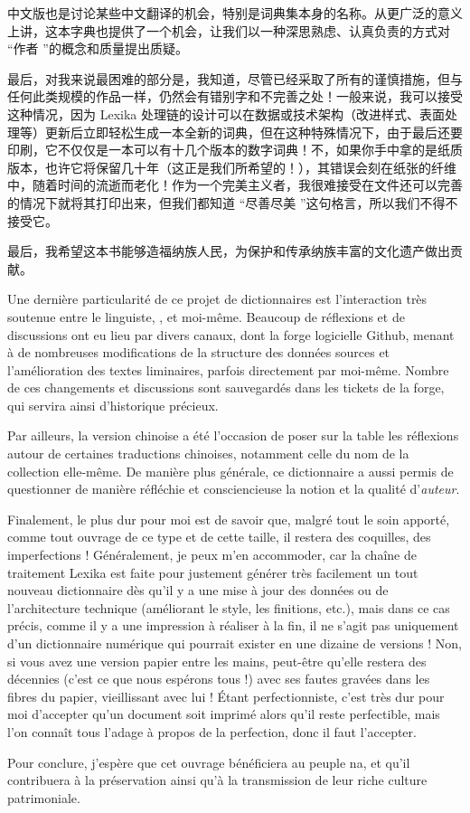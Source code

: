 中文版也是讨论某些中文翻译的机会，特别是词典集本身的名称。从更广泛的意义上讲，这本字典也提供了一个机会，让我们以一种深思熟虑、认真负责的方式对 “作者 ”的概念和质量提出质疑。

最后，对我来说最困难的部分是，我知道，尽管已经采取了所有的谨慎措施，但与任何此类规模的作品一样，仍然会有错别字和不完善之处！一般来说，我可以接受这种情况，因为 Lexika 处理链的设计可以在数据或技术架构（改进样式、表面处理等）更新后立即轻松生成一本全新的词典，但在这种特殊情况下，由于最后还要印刷，它不仅仅是一本可以有十几个版本的数字词典！不，如果你手中拿的是纸质版本，也许它将保留几十年（这正是我们所希望的！），其错误会刻在纸张的纤维中，随着时间的流逝而老化！作为一个完美主义者，我很难接受在文件还可以完善的情况下就将其打印出来，但我们都知道 “尽善尽美 ”这句格言，所以我们不得不接受它。

最后，我希望这本书能够造福纳族人民，为保护和传承纳族丰富的文化遗产做出贡献。



Une dernière particularité de ce projet de dictionnaires est l’interaction très soutenue entre le linguiste, \alexisfra, et moi-même. Beaucoup de réflexions et de discussions ont eu lieu par divers canaux, dont la forge logicielle Github, menant à de nombreuses modifications de la structure des données sources et l’amélioration des textes liminaires, parfois directement par moi-même. Nombre de ces changements et discussions sont sauvegardés dans les tickets de la forge, qui servira ainsi d’historique précieux.

Par ailleurs, la version chinoise a été l’occasion de poser sur la table les réflexions autour de certaines traductions chinoises, notamment celle du nom de la collection elle-même. De manière plus générale, ce dictionnaire a aussi permis de questionner de manière réfléchie et consciencieuse la notion et la qualité d’\emph{auteur}.

Finalement, le plus dur pour moi est de savoir que, malgré tout le soin apporté, comme tout ouvrage de ce type et de cette taille, il restera des coquilles, des imperfections ! Généralement, je peux m’en accommoder, car la chaîne de traitement Lexika est faite pour justement générer très facilement un tout nouveau dictionnaire dès qu’il y a une mise à jour des données ou de l’architecture technique (améliorant le style, les finitions, etc.), mais dans ce cas précis, comme il y a une impression à réaliser à la fin, il ne s’agit pas uniquement d’un dictionnaire numérique qui pourrait exister en une dizaine de versions ! Non, si vous avez une version papier entre les mains, peut-être qu’elle restera des décennies (c’est ce que nous espérons tous !) avec ses fautes gravées dans les fibres du papier, vieillissant avec lui ! Étant perfectionniste, c’est très dur pour moi d’accepter qu’un document soit imprimé alors qu’il reste perfectible, mais l’on connaît tous l’adage à propos de la perfection, donc il faut l’accepter.

Pour conclure, j'espère que cet ouvrage bénéficiera au peuple na, et qu'il contribuera à la préservation ainsi qu'à la transmission de leur riche culture patrimoniale.

\bigskip

\hfill \benjaminfra
